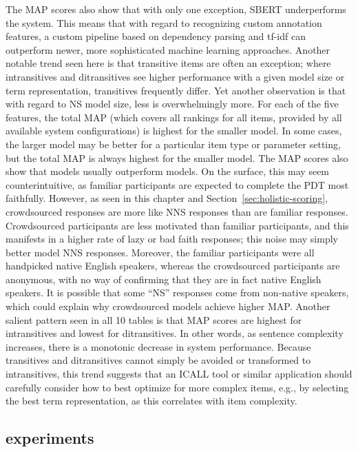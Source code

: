 The MAP scores also show that with only one exception, SBERT underperforms the system. 
This means that with regard to recognizing custom annotation features, a custom pipeline based on dependency parsing and tf-idf can outperform newer, more sophisticated machine learning approaches.  Another notable trend seen here is that transitive items are often an exception; where intransitives and ditransitives see higher performance with a given model size or term representation, transitives frequently differ. Yet another observation is that with regard to NS model size, less is overwhelmingly more. For each of the five features, the total MAP (which covers all rankings for all items, provided by all available system configurations) is highest for the smaller model. In some cases, the larger model may be better for a particular item type or parameter setting, but the total MAP is always highest for the smaller model. The MAP scores also show that  models usually outperform  models. On the surface, this may seem counterintuitive, as familiar participants are expected to complete the PDT most faithfully. However, as seen in this chapter and Section~\ref{sec:holistic-scoring}, crowdsourced responses are more like NNS responses than are familiar responses. Crowdsourced participants are less motivated than familiar participants, and this manifests in a higher rate of lazy or bad faith responses; this noise may simply better model NNS responses. Moreover, the familiar participants were all handpicked native English speakers, whereas the crowdsourced participants are anonymous, with no way of confirming that they are in fact native English speakers. It is possible that some ``NS'' responses come from non-native speakers, which could explain why crowdsourced models achieve higher MAP.
Another salient pattern seen in all 10 tables is that MAP scores are highest for intransitives and lowest for ditransitives. In other words, as sentence complexity increases, there is a monotonic decrease in system performance. Because transitives and ditransitives cannot simply be avoided or transformed to intransitives, this trend suggests that an ICALL tool or similar application should carefully consider how to best optimize for more complex items, e.g., by selecting the best term representation, as this correlates with item complexity.

\subsection{ experiments}
\label{sec:map-core}

